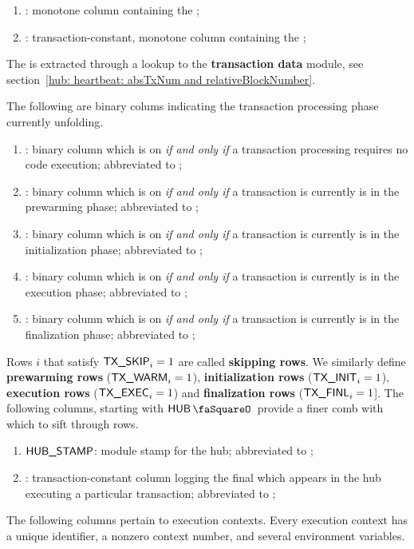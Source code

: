 \begin{enumerate}
	\item \absTxNum{}: monotone column containing the \ABSTXNUM{};
	\item \relativeBlockNumber{}: transaction-constant, monotone column containing the \BATCHNUM{};
\end{enumerate}
\saNote{} The \relativeBlockNumber{} is extracted through a lookup to the \textbf{transaction data} module, see section~\ref{hub: heartbeat: absTxNum and relativeBlockNumber}.

\noindent The following are binary colums indicating the transaction processing phase currently unfolding.
\begin{enumerate}[resume]
	\item \TXSKIP{}:
		binary column which is on \emph{if and only if} a transaction processing requires no code execution; abbreviated to \txSkip{};
	\item \TXWARM{}:
		binary column which is on \emph{if and only if} a transaction is currently is in the prewarming phase; abbreviated to \txWarm{};
	\item \TXINIT{}:
		binary column which is on \emph{if and only if} a transaction is currently is in the initialization phase; abbreviated to \txInit{};
	\item \TXEXEC{}:
		binary column which is on \emph{if and only if} a transaction is currently is in the execution phase; abbreviated to \txExec{};
	\item \TXFINL{}:
		binary column which is on \emph{if and only if} a transaction is currently is in the finalization phase; abbreviated to \txFinl{};
\end{enumerate}
Rows $i$ that satisfy $\textsf{TX}\textsf{\_SKIP}_{i} = 1$ are called \textbf{skipping rows}. We similarly define
\textbf{prewarming rows} ($\textsf{TX}\textsf{\_WARM}_{i} = 1$),
\textbf{initialization rows} ($\textsf{TX}\textsf{\_INIT}_{i} = 1$),
\textbf{execution rows} ($\textsf{TX}\textsf{\_EXEC}_{i} = 1$) and
\textbf{finalization rows} ($\textsf{TX}\textsf{\_FINL}_{i} = 1$].
The following columns, starting with $\hubStamp$ provide a finer comb with which to sift through rows. 
\begin{enumerate}[resume]
	\item $\textsf{HUB\_STAMP}$: module stamp for the hub; abbreviated to \hubStamp{};
	\item \TXENDSTAMP{}: transaction-constant column logging the final \hubStamp{} which appears in the hub executing a particular transaction; abbreviated to \txEndStamp{};
\end{enumerate}
The following columns pertain to execution contexts. Every execution context has a unique identifier, a nonzero context number, and several environment variables. 
